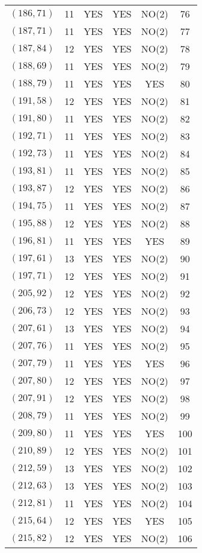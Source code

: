 \begin{longtable}{|c|c|c|c|c|c|}
$(186, 71)$ & 11 & YES & YES & NO(2) & 76\\
$(187, 71)$ & 11 & YES & YES & NO(2) & 77\\
$(187, 84)$ & 12 & YES & YES & NO(2) & 78\\
$(188, 69)$ & 11 & YES & YES & NO(2) & 79\\
$(188, 79)$ & 11 & YES & YES & YES & 80\\
$(191, 58)$ & 12 & YES & YES & NO(2) & 81\\
$(191, 80)$ & 11 & YES & YES & NO(2) & 82\\
$(192, 71)$ & 11 & YES & YES & NO(2) & 83\\
$(192, 73)$ & 11 & YES & YES & NO(2) & 84\\
$(193, 81)$ & 11 & YES & YES & NO(2) & 85\\
$(193, 87)$ & 12 & YES & YES & NO(2) & 86\\
$(194, 75)$ & 11 & YES & YES & NO(2) & 87\\
$(195, 88)$ & 12 & YES & YES & NO(2) & 88\\
$(196, 81)$ & 11 & YES & YES & YES & 89\\
$(197, 61)$ & 13 & YES & YES & NO(2) & 90\\
$(197, 71)$ & 12 & YES & YES & NO(2) & 91\\
$(205, 92)$ & 12 & YES & YES & NO(2) & 92\\
$(206, 73)$ & 12 & YES & YES & NO(2) & 93\\
$(207, 61)$ & 13 & YES & YES & NO(2) & 94\\
$(207, 76)$ & 11 & YES & YES & NO(2) & 95\\
$(207, 79)$ & 11 & YES & YES & YES & 96\\
$(207, 80)$ & 12 & YES & YES & NO(2) & 97\\
$(207, 91)$ & 12 & YES & YES & NO(2) & 98\\
$(208, 79)$ & 11 & YES & YES & NO(2) & 99\\
$(209, 80)$ & 11 & YES & YES & YES & 100\\
$(210, 89)$ & 12 & YES & YES & NO(2) & 101\\
$(212, 59)$ & 13 & YES & YES & NO(2) & 102\\
$(212, 63)$ & 13 & YES & YES & NO(2) & 103\\
$(212, 81)$ & 11 & YES & YES & NO(2) & 104\\
$(215, 64)$ & 12 & YES & YES & YES & 105\\
$(215, 82)$ & 12 & YES & YES & NO(2) & 106\\

\end{longtable}
